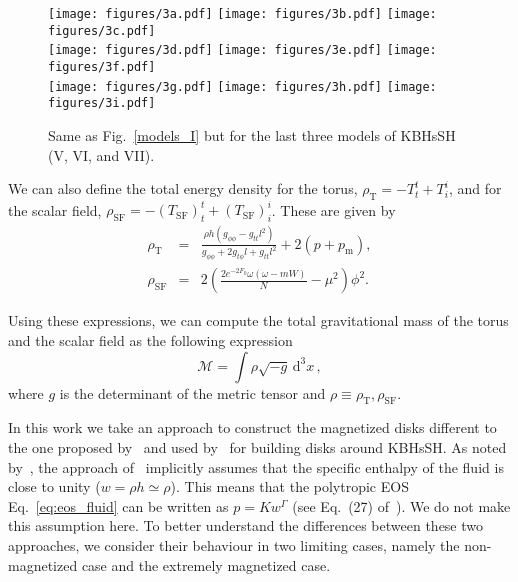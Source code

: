 \documentclass[twocolumn,aps,showpacs,showkeys,prd,superscriptaddress,byrevtex, amsmath]{revtex4-1}
\begin{document}
\begin{figure*}
\centering
\texttt{[image: figures/3a.pdf]}
\hspace{-0.3cm}
\texttt{[image: figures/3b.pdf]}
\hspace{-0.2cm}
\texttt{[image: figures/3c.pdf]}
\\
\texttt{[image: figures/3d.pdf]}
\hspace{-0.3cm}
\texttt{[image: figures/3e.pdf]}
\hspace{-0.2cm}
\texttt{[image: figures/3f.pdf]}
\\
\texttt{[image: figures/3g.pdf]}
\hspace{-0.3cm}
\texttt{[image: figures/3h.pdf]}
\hspace{-0.2cm}
\texttt{[image: figures/3i.pdf]}
\hspace{-0.2cm}
\caption{Same as Fig.~\ref{models_I} but for the last three models of KBHsSH (V, VI, and VII).}
\label{models_II}
\end{figure*}

We can also define the total energy density for the torus, $\rho_{\mathrm{T}}=-T^t_t + T^i_i$, and for the scalar field, $\rho_{\mathrm{SF}}=-(T_{\mathrm{SF}})^t_t + (T_{\mathrm{SF}})^i_i$. These are given by
\begin{eqnarray}\label{eq:torus_energy_density}
\rho_{\mathrm{T}} &=&  \frac{\rho h (g_{\phi\phi} - g_{tt} l^2)}{g_{\phi\phi} + 2 g_{t\phi} l + g_{tt} l^2} + 2 (p + p_{\mathrm{m}}),
\\
\rho_{\mathrm{SF}} &=&  2 \left(\frac{2 e^{-2 F_0} \omega (\omega-m W)}{N} - \mu^2\right) \phi^2.
\end{eqnarray}

Using these expressions, we can compute the total gravitational mass of the torus and the scalar field as the following expression
\begin{equation}\label{eq:mass_integral}
\mathcal{M} = \int  \rho \sqrt{-g}\,\mathrm{d}^3x\,,
\end{equation}
where $g$ is the determinant of the metric tensor and $\rho\equiv \rho_{\mathrm{T}}, \rho_{\mathrm{SF}}$.

In this work we take an approach to construct the magnetized disks different to the one proposed by~\citep{Komissarov:2006} and used by~\cite{Vincent:2016} for building disks around KBHsSH. As noted by~\cite{Gimeno-Soler:2017}, the approach of~\citep{Komissarov:2006} implicitly assumes that the specific enthalpy of the fluid is close to unity ($w = \rho h \simeq \rho$). This means that the polytropic EOS Eq.~\eqref{eq:eos_fluid} can be written as $p = K w^{\Gamma}$ (see Eq.~(27) of~\cite{Komissarov:2006}). We do not make this assumption here. To better understand the differences between these two approaches, we consider their behaviour in two limiting cases, namely the non-magnetized case and the extremely magnetized case.
\end{document}
